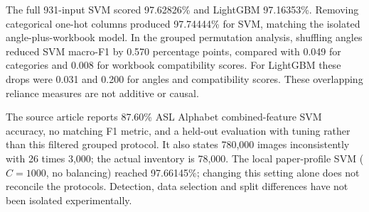 The full 931-input SVM scored 97.62826\% and LightGBM 97.16353\%. Removing categorical one-hot columns produced 97.74444\% for SVM, matching the isolated angle-plus-workbook model. In the grouped permutation analysis, shuffling angles reduced SVM macro-F1 by 0.570 percentage points, compared with 0.049 for categories and 0.008 for workbook compatibility scores. For LightGBM these drops were 0.031 and 0.200 for angles and compatibility scores. These overlapping reliance measures are not additive or causal.

The source article reports 87.60\% ASL Alphabet combined-feature SVM accuracy, no matching F1 metric, and a held-out evaluation with tuning rather than this filtered grouped protocol. It also states 780,000 images inconsistently with 26 times 3,000; the actual inventory is 78,000. The local paper-profile SVM ($C=1000$, no balancing) reached 97.66145\%; changing this setting alone does not reconcile the protocols. Detection, data selection and split differences have not been isolated experimentally.
